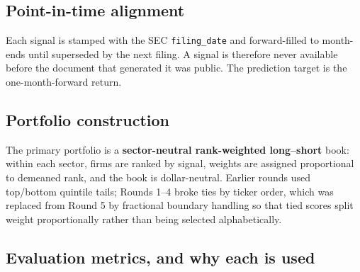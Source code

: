\documentclass[11pt]{article}
\newcommand{\sig}[1]{\texttt{#1}}
\begin{document}
\subsection{Point-in-time alignment}

Each signal is stamped with the SEC \sig{filing\_date} and forward-filled to month-ends
until superseded by the next filing. A signal is therefore never available before the
document that generated it was public. The prediction target is the one-month-forward
return.

\subsection{Portfolio construction}

The primary portfolio is a \textbf{sector-neutral rank-weighted long--short} book: within
each sector, firms are ranked by signal, weights are assigned proportional to demeaned
rank, and the book is dollar-neutral. Earlier rounds used top/bottom quintile tails;
Rounds 1--4 broke ties by ticker order, which was replaced from Round 5 by fractional
boundary handling so that tied scores split weight proportionally rather than being
selected alphabetically.

\subsection{Evaluation metrics, and why each is used}
\end{document}
